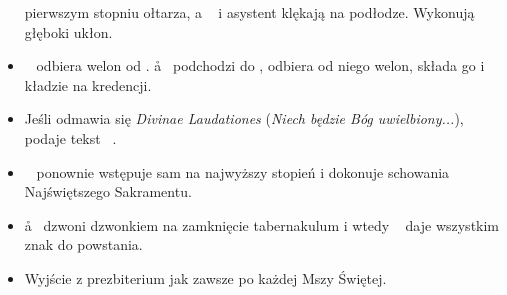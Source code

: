 \begin{itemize}
	      pierwszym stopniu ołtarza, a \cc~ i asystent klękają na podłodze.
	      Wykonują głęboki ukłon.
	\item \cc~ odbiera welon od \ii. \aa~ podchodzi do \cc, odbiera od niego
	      welon, składa go i kładzie na kredencji.
	\item Jeśli odmawia się \textit{Divinae Laudationes} (\textit{Niech będzie
		      Bóg uwielbiony...}), \cc~ podaje tekst \ii~.
	\item \ii~ ponownie wstępuje sam na najwyższy stopień i dokonuje schowania
	      Najświętszego Sakramentu.
	\item \aa~ dzwoni dzwonkiem na zamknięcie tabernakulum i wtedy \cc~ daje
	      wszystkim znak do powstania.
	\item Wyjście z prezbiterium jak zawsze po każdej Mszy Świętej.
\end{itemize}